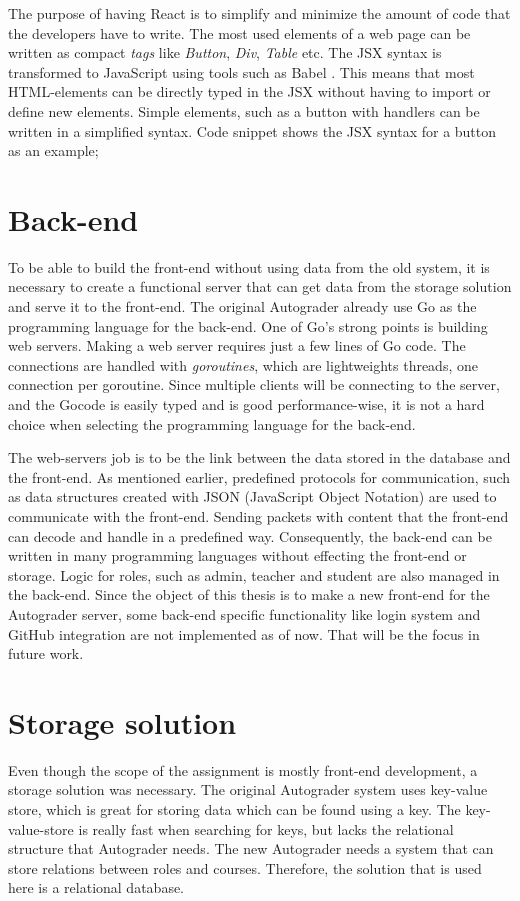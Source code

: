 The purpose of having React is to simplify and minimize the amount of code that the developers have to write. The most used elements of a web page can be written as compact \emph{tags} like \emph{Button}, \emph{Div}, \emph{Table} etc. The JSX syntax is transformed to JavaScript using tools such as Babel . This means that most HTML-elements can be directly typed in the JSX without having to import or define new elements. Simple elements, such as a button with handlers can be written in a simplified syntax. Code snippet  shows the JSX syntax for a button as an example;



\section{Back-end}
To be able to build the front-end without using data from the old system, it is necessary to create a functional server that can get data from the storage solution and serve it to the front-end. The original Autograder already use Go as the programming language for the back-end. One of Go's strong points is building web servers. Making a web server requires just a few lines of Go code. The connections are handled with \emph{goroutines}, which are lightweights threads, one connection per goroutine. Since multiple clients will be connecting to the server, and the Gocode is easily typed and is good performance-wise, it is not a hard choice when selecting the programming language for the back-end. 

The web-servers job is to be the link between the data stored in the database and the front-end. As mentioned earlier, predefined protocols for communication, such as data structures created with JSON (JavaScript Object Notation) are used to communicate with the front-end. Sending packets with content that the front-end can decode and handle in a predefined way. Consequently, the back-end can be written in many programming languages without effecting the front-end or storage. Logic for roles, such as admin, teacher and student are also managed in the back-end. Since the object of this thesis is to make a new front-end for the Autograder server, some back-end specific functionality like login system and GitHub integration are not implemented as of now. That will be the focus in future work.

\section{Storage solution}
Even though the scope of the assignment is mostly front-end development, a storage solution was necessary. The original Autograder system uses key-value store, which is great for storing data which can be found using a key. The key-value-store is really fast when searching for keys, but lacks the relational structure that Autograder needs. The new Autograder needs a system that can store relations between roles and courses. Therefore, the solution that is used here is a relational database. 

